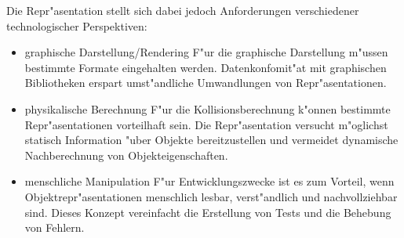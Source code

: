 Die Repr"asentation stellt sich dabei jedoch Anforderungen verschiedener technologischer Perspektiven:
		\begin{itemize}
			\item graphische Darstellung/Rendering
				F"ur die graphische Darstellung m"ussen bestimmte Formate eingehalten werden. Datenkonfomit"at mit graphischen Bibliotheken erspart umst"andliche Umwandlungen von Repr"asentationen.
			\item physikalische Berechnung
				F"ur die Kollisionsberechnung k"onnen bestimmte Repr"asentationen vorteilhaft sein. Die Repr"asentation versucht m"oglichst statisch Information "uber Objekte bereitzustellen und vermeidet dynamische Nachberechnung von Objekteigenschaften.
			\item menschliche Manipulation
				F"ur Entwicklungszwecke ist es zum Vorteil, wenn Objektrepr"asentationen menschlich lesbar, verst"andlich und nachvollziehbar sind. Dieses Konzept vereinfacht die Erstellung von Tests und die Behebung von Fehlern.
		\end{itemize}

